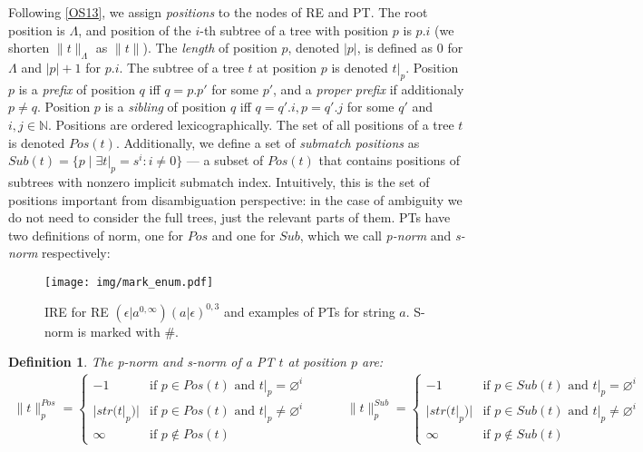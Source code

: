 \documentclass[AMA,STIX1COL]{WileyNJD-v2}
\newcommand{\XP}{\mathcal{P}}
\newcommand{\YN}{\mathbb{N}}
\newcommand{\pnorm}[2]{\|{#1}\|^{Pos}_{#2}}
\newcommand{\snorm}[2]{\|{#1}\|^{Sub}_{#2}}
\newtheorem{Xdef}{Definition}
\begin{document}
Following \ref{OS13}, we assign \emph{positions} to the nodes of RE and PT.
The root position is $\Lambda$, and position of the $i$-th subtree of a tree with position $p$ is $p.i$
(we shorten $\|t\|_\Lambda$ as $\|t\|$).
The \emph{length} of position $p$, denoted $|p|$, is defined as $0$ for $\Lambda$ and $|p| + 1$ for $p.i$.
The subtree of a tree $t$ at position $p$ is denoted $t|_p$.
Position $p$ is a \emph{prefix} of position $q$ iff $q = p.p'$ for some $p'$,
and a \emph{proper prefix} if additionaly $p \neq q$.
Position $p$ is a \emph{sibling} of position $q$ iff $q = q'.i, p = q'.j$ for some $q'$ and $i,j \in \YN$.
Positions are ordered lexicographically.
The set of all positions of a tree $t$ is denoted $Pos(t)$.
Additionally, we define a set of \emph{submatch positions} as
$Sub(t) = \big\{ p \mid \exists t|_p = s^i : i \neq 0 \big\}$ ---
a subset of $Pos(t)$ that contains positions of subtrees with nonzero implicit submatch index.
Intuitively, this is the set of positions important from disambiguation perspective:
in the case of ambiguity we do not need to consider the full trees,
just the relevant parts of them.
%
PTs have two definitions of norm, one for $Pos$ and one for $Sub$,
which we call \emph{p-norm} and \emph{s-norm} respectively:

\begin{figure}\label{fig_mark_enum}
\texttt{[image: img/mark\_enum.pdf]}
\vspace{-2em}
\caption{
IRE for RE $(\epsilon|a^{0,\infty})(a|\epsilon)^{0,3}$
and examples of PTs for string $a$.
S-norm is marked with $\#$.
}
\end{figure}


    \begin{Xdef}\label{tnorm_of_PTs}
    The \emph{p-norm} and \emph{s-norm} of a PT $t$ at position $p$ are:
    \begin{align*}
        \pnorm{t}{p} =
            \begin{cases}
                -1          &\text{if } p \in Pos(t) \text{ and } t|_p = \varnothing^i  \\[-0.2em]
                |str(t|_p)| &\text{if } p \in Pos(t) \text{ and } t|_p \neq \varnothing^i \\[-0.2em]
                \infty      &\text{if } p \not\in Pos(t)
            \end{cases}
    \quad\quad\quad
        \snorm{t}{p} =
            \begin{cases}
                -1          &\text{if } p \in Sub(t) \text{ and } t|_p = \varnothing^i  \\[-0.2em]
                |str(t|_p)| &\text{if } p \in Sub(t) \text{ and } t|_p \neq \varnothing^i \\[-0.2em]
                \infty      &\text{if } p \not\in Sub(t)
            \end{cases}
    \end{align*}
    \end{Xdef}
\end{document}
